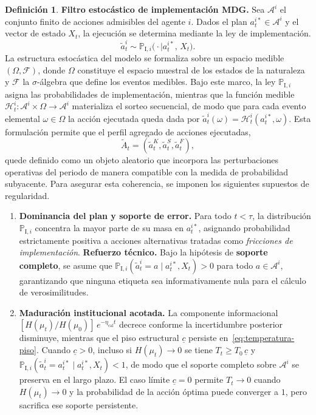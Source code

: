 \documentclass[12pt]{article}
\theoremstyle{definition}
\newtheorem{definition}[theorem]{Definición}
\theoremstyle{remark}
\newcommand{\ProbI}[1]{\mathbb{P}_{\mathrm{I},#1}}
\newcommand{\1}{\mathbf{1}}
\begin{document}
\medskip
\begin{definition}
\label{def:mano-dios-filtro}
\noindent\textbf{Filtro estocástico de implementación MDG.} Sea $\mathcal{A}^i$ el conjunto finito de acciones admisibles del agente $i$. Dados el plan $a_t^{i\ast}\in\mathcal{A}^i$ y el vector de estado $X_t$, la ejecución se determina mediante la ley de implementación.
\[
\tilde{a}_t^i \sim \ProbI{i}\bigl(\cdot \mid a_t^{i\ast},\,X_t\bigr).
\]
\noindent La estructura estocástica del modelo se formaliza sobre un espacio medible $(\Omega, \mathcal{F})$, donde $\Omega$ constituye el espacio muestral de los estados de la naturaleza y $\mathcal{F}$ la $\sigma$-álgebra que define los eventos medibles. Bajo este marco, la ley $\ProbI{i}$ asigna las probabilidades de implementación, mientras que la función medible $\mathcal{H}_t^i : \mathcal{A}^i \times \Omega \to \mathcal{A}^i$ materializa el sorteo secuencial, de modo que para cada evento elemental $\omega\in\Omega$ la acción ejecutada queda dada por $\tilde{a}_t^i(\omega) = \mathcal{H}_t^i(a_t^{i\ast}, \omega)$. Esta formulación permite que el perfil agregado de acciones ejecutadas,
\begin{equation}
\label{eq:tilde-A-t}
\tilde{A}_t = (\tilde{a}_t^K, \tilde{a}_t^S, \tilde{a}_t^F),
\end{equation}
quede definido como un objeto aleatorio que incorpora las perturbaciones operativas del periodo de manera compatible con la medida de probabilidad subyacente. Para asegurar esta coherencia, se imponen los siguientes supuestos de regularidad.
\begin{enumerate}
  \item[\textup{(i)}] \textbf{Dominancia del plan y soporte de error.} Para todo $t < \tau$, la distribución $\ProbI{i}$ concentra la mayor parte de su masa en $a_t^{i\ast}$, asignando probabilidad estrictamente positiva a acciones alternativas tratadas como \emph{fricciones de implementación}. \textbf{Refuerzo técnico.} Bajo la hipótesis de \textbf{soporte completo}, se asume que $\ProbI{i}(\tilde{a}_t^i=a \mid a_t^{i\ast}, X_t) > 0$ para todo $a \in \mathcal{A}^i$, garantizando que ninguna etiqueta sea informativamente nula para el cálculo de verosimilitudes.
  
  \item[\textup{(ii)}] \textbf{Maduración institucional acotada.} La componente informacional $[H(\mu_t)/H(\mu_0)]\,e^{-\eta_{\mathrm{cal}}t}$ decrece conforme la incertidumbre posterior disminuye, mientras que el piso estructural $\underline{c}$ persiste en~\eqref{eq:temperatura-piso}. Cuando $\underline{c}>0$, incluso si $H(\mu_t)\to 0$ se tiene $T_t\ge T_0\,\underline{c}$ y $\ProbI{i}(\tilde{a}_t^i=a_t^{i\ast}\mid a_t^{i\ast},X_t)<1$, de modo que el soporte completo sobre $\mathcal{A}^i$ se preserva en el largo plazo. El caso límite $\underline{c}=0$ permite $T_t\to 0$ cuando $H(\mu_t)\to 0$ y la probabilidad de la acción óptima puede converger a $1$, pero sacrifica ese soporte persistente.
\end{enumerate}
\end{definition}
\end{document}
